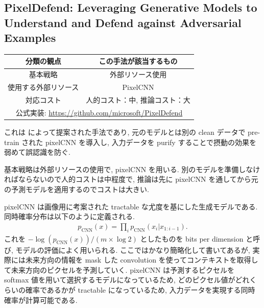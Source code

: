 \subsection{PixelDefend: Leveraging Generative Models to Understand and Defend against Adversarial Examples}
\label{subsec:pixeldefend}
%
\begin{table}[htbp]
\begin{center}
\begin{tabular}{|c|c|}
\hline
分類の観点 & この手法が該当するもの \\
\hline
基本戦略 & 外部リソース使用 \\
使用する外部リソース & PixelCNN \\
対応コスト & 人的コスト：中, 推論コスト：大 \\
\hline
\multicolumn{2}{|c|}{公式実装: \href{https://github.com/microsoft/PixelDefend}{https://github.com/microsoft/PixelDefend}} \\
\hline
\end{tabular}
\label{tb:pixeldefend-summary}
\end{center}
\end{table}
%

これは \cite{song2017pixeldefend} によって提案された手法であり, 元のモデルとは別の clean データで pre-train された pixelCNN を導入し, 入力データを purify することで摂動の効果を弱めて誤認識を防ぐ.

基本戦略は外部リソースの使用で, pixelCNN を用いる.
別のモデルを準備しなければならないので人的コストは中程度で, 推論は先に pixelCNN を通してから元の予測モデルを適用するのでコストは大きい.

pixelCNN \cite{oord2016pixel, salimans2017pixelcnn++} は画像用に考案された tractable な尤度を基にした生成モデルである.
同時確率分布は以下のように定義される.
%
\begin{eqnarray}
p_{\text{CNN}} (x) = \prod_{i} p_{\text{CNN}} (x_i | x_{1:i-1}).
\label{eq:pixeldefend-pixelcnn-joint-distrib}
\end{eqnarray}
%
これを $- \log \left( p_{\text{CNN}} (x) \right) / (m \times \log 2)$ としたものを bits per dimension と呼び, モデルの評価によく用いられる.
ここではかなり簡略化して書いてあるが, 実際には未来方向の情報を mask した convolution を使ってコンテキストを取得して未来方向のピクセルを予測していく.
pixelCNN は予測するピクセルを softmax 値を用いて選択するモデルになっているため, どのピクセル値がどれくらいの確率であるかが tractable になっているため, 入力データを実現する同時確率が計算可能である.

